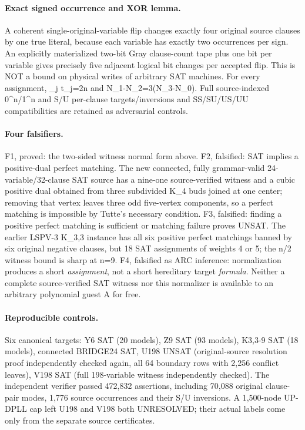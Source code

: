 \documentclass[10pt]{article}
\begin{document}
\paragraph{Exact signed occurrence and XOR lemma.}
A coherent single-original-variable flip changes exactly four original source clauses by one true literal, because each variable has exactly two occurrences per sign. An explicitly materialized two-bit Gray clause-count tape plus one bit per variable gives precisely five adjacent logical bit changes per accepted flip. This is NOT a bound on physical writes of arbitrary SAT machines. For every assignment, \sum_j t_j=2n and N_1-N_2=3(N_3-N_0). Full source-indexed 0^n/1^n and S/U per-clause targets/inversions and SS/SU/US/UU compatibilities are retained as adversarial controls.
\paragraph{Four falsifiers.}
F1, proved: the two-sided witness normal form above. F2, falsified: SAT implies a positive-dual perfect matching. The new connected, fully grammar-valid 24-variable/32-clause SAT source has a nine-one source-verified witness and a cubic positive dual obtained from three subdivided K_4 buds joined at one center; removing that vertex leaves three odd five-vertex components, so a perfect matching is impossible by Tutte's necessary condition. F3, falsified: finding a positive perfect matching is sufficient or matching failure proves UNSAT. The earlier LSPV-3 K_{3,3} instance has all six positive perfect matchings banned by six original negative clauses, but 18 SAT assignments of weights 4 or 5; the n/2 witness bound is sharp at n=9. F4, falsified as ARC inference: normalization produces a short \emph{assignment}, not a short hereditary target \emph{formula}. Neither a complete source-verified SAT witness nor this normalizer is available to an arbitrary polynomial guest A for free.
\paragraph{Reproducible controls.}
Six canonical targets: Y6 SAT (20 models), Z9 SAT (93 models), K3,3-9 SAT (18 models), connected BRIDGE24 SAT, U198 UNSAT (original-source resolution proof independently checked again, all 64 boundary rows with 2,256 conflict leaves), V198 SAT (full 198-variable witness independently checked). The independent verifier passed 472,832 assertions, including 70,088 original clause-pair modes, 1,776 source occurrences and their S/U inversions. A 1,500-node UP-DPLL cap left U198 and V198 both UNRESOLVED; their actual labels come only from the separate source certificates.
\end{document}
